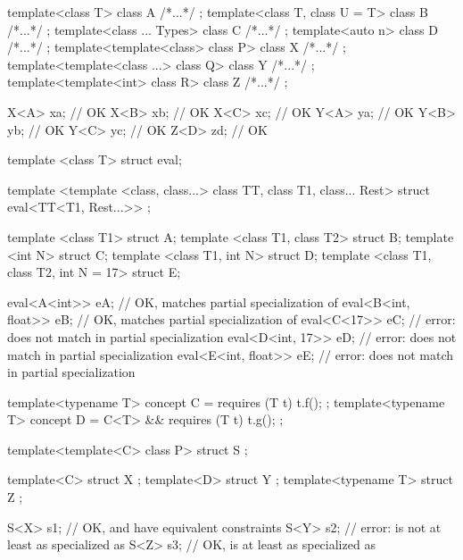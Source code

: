 \documentclass{wg21}
\begin{document}
\begin{example}
\begin{codeblock}
    template<class T> class A { /*...*/ };
    template<class T, class U = T> class B { /*...*/ };
    template<class ... Types> class C { /*...*/ };
    template<auto n> class D { /*...*/ };
    template<template<class> class P> class X { /*...*/ };
    template<template<class ...> class Q> class Y { /*...*/ };
    template<template<int> class R> class Z { /*...*/ };

    X<A> xa;            // OK
    X<B> xb;            // OK
    X<C> xc;            // OK
    Y<A> ya;            // OK
    Y<B> yb;            // OK
    Y<C> yc;            // OK
    Z<D> zd;            // OK
\end{codeblock}
\end{example}
\begin{example}
\begin{codeblock}
    template <class T> struct eval;

    template <template <class, class...> class TT, class T1, class... Rest>
    struct eval<TT<T1, Rest...>> { };

    template <class T1> struct A;
    template <class T1, class T2> struct B;
    template <int N> struct C;
    template <class T1, int N> struct D;
    template <class T1, class T2, int N = 17> struct E;

    eval<A<int>> eA;                // OK, matches partial specialization of 
    eval<B<int, float>> eB;         // OK, matches partial specialization of 
    eval<C<17>> eC;                 // error:  does not match  in partial specialization
    eval<D<int, 17>> eD;            // error:  does not match  in partial specialization
    eval<E<int, float>> eE;         // error:  does not match  in partial specialization
\end{codeblock}
\end{example}
\begin{example}
    \begin{codeblock}
        template<typename T> concept C = requires (T t) { t.f(); };
        template<typename T> concept D = C<T> && requires (T t) { t.g(); };

        template<template<C> class P> struct S { };

        template<C> struct X { };
        template<D> struct Y { };
        template<typename T> struct Z { };

        S<X> s1;            // OK,  and  have equivalent constraints
        S<Y> s2;            // error:  is not at least as specialized as 
        S<Z> s3;            // OK,  is at least as specialized as 
    \end{codeblock}
\end{example}
\end{document}
